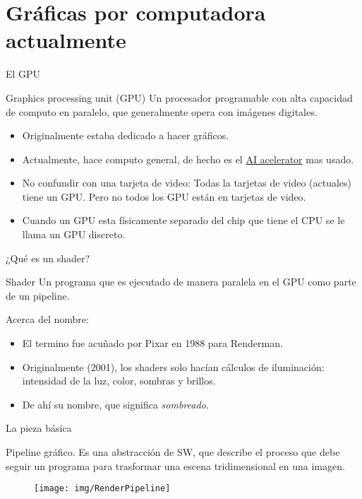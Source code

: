 \section{Gráficas por computadora actualmente}

\begin{frame}{El GPU}
\begin{block}{Graphics processing unit (GPU)}
    Un procesador programable con alta capacidad de computo en paralelo, que generalmente opera con imágenes digitales.
\end{block}
    \begin{itemize}
        \item Originalmente estaba dedicado a hacer gráficos.
        \item Actualmente, hace computo general, de hecho es el \href{https://en.wikipedia.org/wiki/AI_accelerator}{AI acelerator} mas usado.
        \item No confundir con una tarjeta de video: Todas la tarjetas de video (actuales) tiene un GPU. Pero no todos los GPU están en tarjetas de video.
        \item Cuando un GPU esta físicamente separado del chip que tiene el CPU se le llama un GPU discreto.
     \end{itemize}
\end{frame}

\begin{frame}{¿Qué es un shader?}
\begin{block}{Shader}
    Un programa que es ejecutado de manera paralela en el GPU como parte de un pipeline.
\end{block}
Acerca del nombre:
    \begin{itemize}
        \item El termino fue acuñado por Pixar en 1988 para Renderman.
        \item Originalmente (2001), los shaders solo hacían cálculos de iluminación: intensidad de la luz, color, sombras y brillos.
        \item De ahí su nombre, que significa \emph{sombreado}.
     \end{itemize}

\end{frame}

\begin{frame}{La pieza básica}
\begin{block}{Pipeline gráfico.}
    Es una abstracción de SW, que describe el proceso que debe seguir un programa para trasformar una escena tridimensional en una imagen.
\end{block}
\begin{figure}[htb]
  \centering
  \texttt{[image: img/RenderPipeline]}
\end{figure} 
\end{frame}

